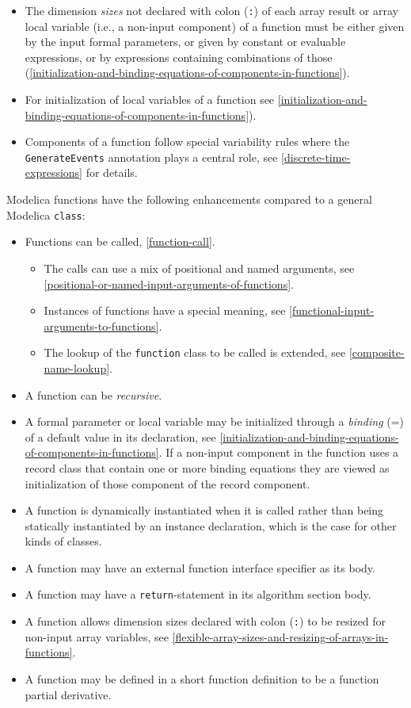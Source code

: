 \begin{itemize}
\item
  The dimension \emph{sizes} not declared with colon (\lstinline!:!) of each array result or array local variable (i.e., a non-input component) of a function must be either given by the input formal parameters, or given by constant or evaluable expressions, or by expressions containing combinations of those (\cref{initialization-and-binding-equations-of-components-in-functions}).
\item
  For initialization of local variables of a function see \cref{initialization-and-binding-equations-of-components-in-functions}).
\item
  Components of a function follow special variability rules where the \lstinline!GenerateEvents! annotation plays a central role, see \cref{discrete-time-expressions} for details.
\end{itemize}

Modelica functions have the following enhancements compared to a general Modelica \lstinline!class!:
\begin{itemize}
\item
  Functions can be called, \cref{function-call}.
  \begin{itemize}
  \item
    The calls can use a mix of positional and named arguments, see \cref{positional-or-named-input-arguments-of-functions}.
  \item
    Instances of functions have a special meaning, see \cref{functional-input-arguments-to-functions}.
  \item
    The lookup of the \lstinline!function! class to be called is extended, see \cref{composite-name-lookup}.
  \end{itemize}
\item
  A function can be \emph{recursive}.
\item
  A formal parameter or local variable may be initialized through a \emph{binding} (=) of a default value in its declaration, see \cref{initialization-and-binding-equations-of-components-in-functions}.
  If a non-input component in the function uses a record class that contain one or more binding equations they are viewed as initialization of those component of the record component.
\item
  A function is dynamically instantiated when it is called rather than being statically instantiated by an instance declaration, which is the case for other kinds of classes.
\item
  A function may have an external function interface specifier as its body.
\item
  A function may have a \lstinline!return!-statement in its algorithm section body.
\item
  A function allows dimension sizes declared with colon (\lstinline!:!) to be resized for non-input array variables, see \cref{flexible-array-sizes-and-resizing-of-arrays-in-functions}.
\item
  A function may be defined in a short function definition to be a function partial derivative.
\end{itemize}

